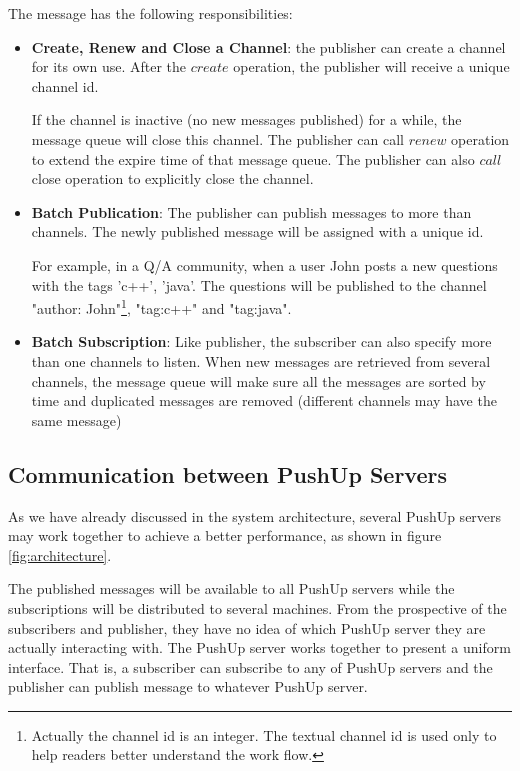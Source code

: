 The message has the following responsibilities:
\begin{itemize}
    \item {\bf Create, Renew and Close a Channel}: the publisher can create
            a channel for its own use. After the $create$ 
            operation, the publisher will receive a unique channel id.

            If the channel is inactive (no new messages published) for a 
            while, the message queue will close this channel. The publisher
            can call $renew$ operation to extend the expire time of that message
            queue. The publisher can also $call$ close operation to explicitly
            close the channel.
    \item {\bf Batch Publication}: The publisher can publish messages to more than 
            channels. The newly published message will be assigned with a 
            unique id.
            
            For example, in a Q/A community, when a user John posts a new 
            questions with the tags 'c++', 'java'. The questions will be 
            published to the channel "author: John"\footnote{Actually the channel 
            id is an integer. The textual channel id is used only to help readers
            better understand the work flow.}, "tag:c++" and "tag:java".

    \item {\bf Batch Subscription}: Like publisher, the subscriber can also specify
            more than one channels to listen. When new messages are retrieved from
            several channels, the message queue will make sure all the messages 
            are sorted by time and duplicated messages are removed (different 
            channels may have the same message)
\end{itemize}

\subsection{Communication between PushUp Servers\\}

As we have already discussed in the system architecture, several PushUp 
servers may work together to achieve a better performance, as shown in 
figure \ref{fig:architecture}.

The published messages will be available to all PushUp servers while the
subscriptions will be distributed to several machines. From the prospective
of the subscribers and publisher, they have no idea of which PushUp server
they are actually interacting with. The PushUp server works together to present
a uniform interface. That is, a subscriber can subscribe to any of PushUp 
servers and the publisher can publish message to whatever PushUp server. 

